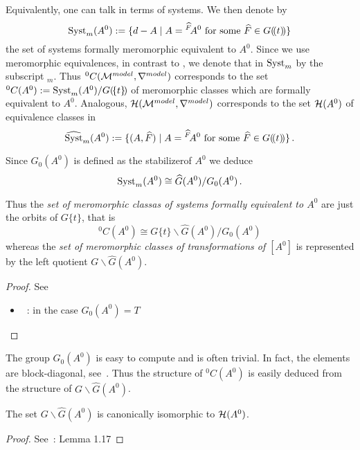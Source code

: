 Equivalently, one can talk in terms of systems. We then denote by
\[
  \operatorname{Syst}_m(A^0):=\{d-A
    \mid A={}^{\widehat F}\!A^0 \text{ for some } \widehat F\in G(\!(t)\!)\}
\]
the set of systems formally meromorphic equivalent to $A^0$.
Since we use meromorphic equivalences, in contrast to \cite{boalch,thboalch},
we denote that in $\operatorname{Syst}_m$ by the subscript ${}_m$.
Thus ${}^0C(\mathcal{M}^{model},\nabla^{model})$ corresponds to
the set ${}^0C(A^0):=\operatorname{Syst}_m(A^0)/G(\!\{t\}\!)$ of meromorphic classes which
are formally equivalent to $A^0$.
Analogous, $\mathcal{H}(\mathcal{M}^{model},\nabla^{model})$ corresponds to the set $\mathcal{H}(A^0)$ of
equivalence classes in
\[
  \widehat{\operatorname{Syst}}_m(A^0):=\{(A,\widehat F)
    \mid A={}^{\widehat F}\!A^0 \text{ for some } \widehat F\in G(\!(t)\!)\} \,.
\]

\begin{lem}
  Since $G_0(A^0)$ is defined as the stabilizer\TODO[correct?] of $A^0$ we deduce
  \[
    \operatorname{Syst}_m(A^0)\cong \widehat G(A^0)/G_0(A^0) \,.
  \]
  \begin{cor}
    Thus the \emph{set of meromorphic classas of systems formally equivalent
      to $A^0$} are just the orbits of $G\{t\}$, that is
    \[
      {}^0C(A^0)\cong G\{t\}\backslash\hat G(A^0)/G_0(A^0)
    \]
    whereas the \emph{set of meromorphic classes of transformations of $[A^0]$}
    is represented by the left quotient $G\backslash\hat G(A^0)$.
  \end{cor}
\end{lem}
\begin{proof}
  See
  \begin{itemize}
    \item~\cite[6]{thboalch}: in the case $G_0(A^0)=T$
  \end{itemize}
\end{proof}

The group $G_0(A^0)$ is easy to compute and is often trivial. In fact, the
elements are block-diagonal, see~\cite[77]{Loday2014}.
Thus the structure of ${}^0C(A^0)$ is easily deduced from the structure of
$G\backslash\hat G(A^0)$.

\begin{lem}
  The set $G\backslash\hat G(A^0)$ is canonically isomorphic to $\mathcal{H}(A^0)$.
\end{lem}
\begin{proof}
  See~\cite{thboalch}: Lemma 1.17
\end{proof}

